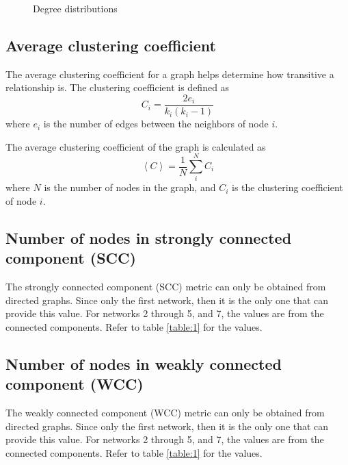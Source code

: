 \begin{figure}
    \qquad
    \caption{Degree distributions}
    \label{fig:4}
\end{figure}

\subsection{Average clustering coefficient}
The average clustering coefficient for a graph helps determine how transitive a relationship is. The clustering coefficient is defined as
\begin{equation}
    C_i = \frac{2e_i}{k_i(k_i-1)}
    \label{equation:clustering_coef}
\end{equation}
where $e_i$ is the number of edges between the neighbors of node $i$.

The average clustering coefficient of the graph is calculated as
\begin{equation}
    \left\langle C \right\rangle = \frac{1}{N}\sum_{i}^{N}C_i
    \label{equation:avg_clustering_coef}
\end{equation}
where $N$ is the number of nodes in the graph, and $C_i$ is the clustering coefficient of node $i$.

\subsection{Number of nodes in strongly connected component (SCC)}
The strongly connected component (SCC) metric can only be obtained from directed graphs. Since only the first network, then it is the only one that can provide this value. For networks 2 through 5, and 7, the values are from the connected components. Refer to table \ref{table:1} for the values.

\subsection{Number of nodes in weakly connected component (WCC)}
The weakly connected component (WCC) metric can only be obtained from directed graphs. Since only the first network, then it is the only one that can provide this value. For networks 2 through 5, and 7, the values are from the connected components. Refer to table \ref{table:1} for the values.

